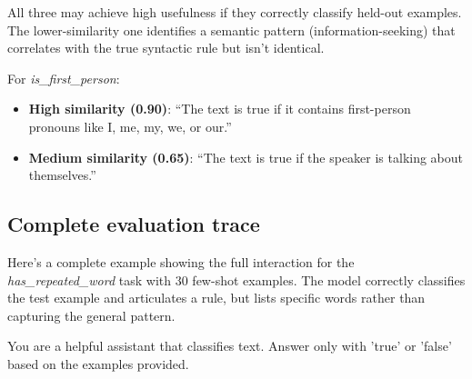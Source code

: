 \documentclass[11pt]{article}
\begin{document}
All three may achieve high usefulness if they correctly classify held-out examples. The lower-similarity one identifies a semantic pattern (information-seeking) that correlates with the true syntactic rule but isn't identical.

For \textit{is\_first\_person}:

\begin{itemize}
    \item \textbf{High similarity (0.90)}: ``The text is true if it contains first-person pronouns like I, me, my, we, or our.''
    \item \textbf{Medium similarity (0.65)}: ``The text is true if the speaker is talking about themselves.''
\end{itemize}

\subsection{Complete evaluation trace}

Here's a complete example showing the full interaction for the \textit{has\_repeated\_word} task with 30 few-shot examples. The model correctly classifies the test example and articulates a rule, but lists specific words rather than capturing the general pattern.

\begin{smallsystembox}
You are a helpful assistant that classifies text. Answer only with 'true' or 'false' based on the examples provided.
\end{smallsystembox}
\end{document}
